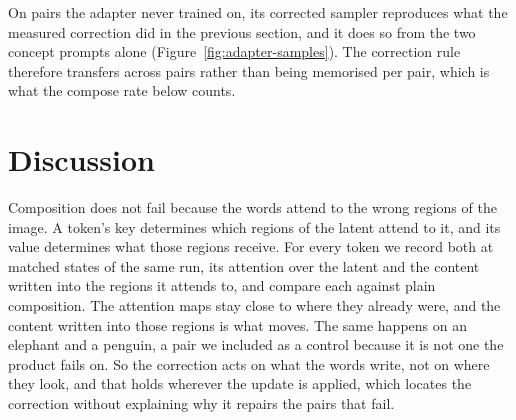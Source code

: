 \documentclass{article} %
\begin{document}
On pairs the adapter never trained on, its corrected sampler reproduces what the measured correction did in the previous section, and it does so from the two concept prompts alone (Figure~\ref{fig:adapter-samples}). The correction rule therefore transfers across pairs rather than being memorised per pair, which is what the compose rate below counts.


\FloatBarrier
\section{Discussion}
\label{sec:discussion}
Composition does not fail because the words attend to the wrong regions of the image. A token's key determines which regions of the latent attend to it, and its value determines what those regions receive. For every token we record both at matched states of the same run, its attention over the latent and the content written into the regions it attends to, and compare each against plain composition. The attention maps stay close to where they already were, and the content written into those regions is what moves. The same happens on an elephant and a penguin, a pair we included as a control because it is not one the product fails on. So the correction acts on what the words write, not on where they look, and that holds wherever the update is applied, which locates the correction without explaining why it repairs the pairs that fail.
\end{document}
